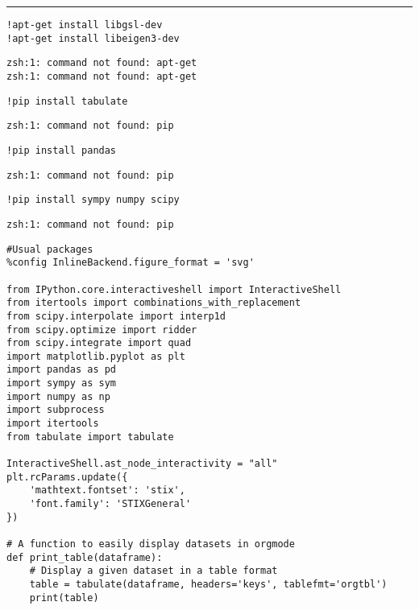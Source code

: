 \documentclass[11pt]{article}
\begin{document}
\noindent\rule{\textwidth}{0.5pt}

\begin{verbatim}
!apt-get install libgsl-dev
!apt-get install libeigen3-dev
\end{verbatim}

\label{org05e4215}
\begin{verbatim}
zsh:1: command not found: apt-get
zsh:1: command not found: apt-get
\end{verbatim}

\begin{verbatim}
!pip install tabulate
\end{verbatim}

\label{orge05e2ea}
\begin{verbatim}
zsh:1: command not found: pip
\end{verbatim}

\begin{verbatim}
!pip install pandas
\end{verbatim}

\label{orgce4cc65}
\begin{verbatim}
zsh:1: command not found: pip
\end{verbatim}

\begin{verbatim}
!pip install sympy numpy scipy
\end{verbatim}

\label{org647205d}
\begin{verbatim}
zsh:1: command not found: pip
\end{verbatim}

\begin{verbatim}
#Usual packages
%config InlineBackend.figure_format = 'svg'

from IPython.core.interactiveshell import InteractiveShell
from itertools import combinations_with_replacement
from scipy.interpolate import interp1d
from scipy.optimize import ridder
from scipy.integrate import quad
import matplotlib.pyplot as plt
import pandas as pd
import sympy as sym
import numpy as np
import subprocess
import itertools
from tabulate import tabulate

InteractiveShell.ast_node_interactivity = "all"
plt.rcParams.update({
    'mathtext.fontset': 'stix',
    'font.family': 'STIXGeneral'
})

# A function to easily display datasets in orgmode
def print_table(dataframe):
    # Display a given dataset in a table format
    table = tabulate(dataframe, headers='keys', tablefmt='orgtbl')
    print(table)
\end{verbatim}
\end{document}
